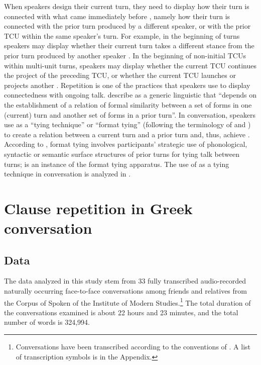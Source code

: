 \documentclass[output=paper]{LSP/langsci}
\begin{document}
When speakers design their current turn, they need to display how their turn is connected with what came immediately before \citep[][134]{drew12}, namely how their turn is connected with the prior turn produced by a different speaker, or with the prior TCU within the same speaker’s turn. For example, in the beginning of turns speakers may display whether their current turn takes a different stance from the prior turn produced by another speaker \citep{schegloff96b}. In the beginning of non-initial TCUs within multi-unit turns, speakers may display whether the current TCU continues the project of the preceding TCU, or whether the current TCU launches or projects another  \citep[][481]{maze12}. Repetition is one of the practices that speakers use to display connectedness with ongoing talk. \citet{couper17} describe  as a generic linguistic  that ``depends on the establishment of a relation of formal similarity between a set of forms in one (current) turn and another set of forms in a prior turn''. In conversation, speakers use  as a ``tying technique'' \citep{sacks95} or ``format tying'' (following the terminology of \citealt{goodwin87} and \citealt{goodwin90}) to create a relation between a current turn and a prior turn and, thus, achieve . According to \citet[][177]{goodwin90}, format tying involves participants’ strategic use of phonological, syntactic or semantic surface structures of prior turns for tying talk between turns;  is an instance of the format tying apparatus. The use of  as a tying technique in  conversation is analyzed in .  

\section{Clause repetition in Greek conversation}
\label{Alclause.repetition}

\subsection{Data}
\label{Alclause.repetition.data}
The data analyzed in this study stem from 33 fully transcribed audio-recorded naturally occurring face-to-face conversations among friends and relatives from the Corpus of Spoken  of the Institute of Modern  Studies.\footnote{Conversations have been transcribed according to the conventions of . A list of transcription symbols is in the Appendix.} The total duration of the conversations examined is about 22 hours and 23 minutes, and the total number of words is 324,994.
\end{document}
